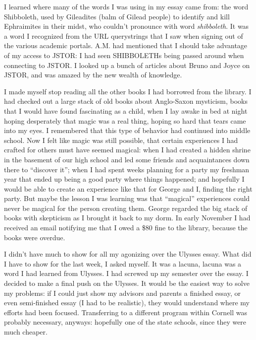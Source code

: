 I learned where many of the words I was using in my essay came from: the word
Shibboleth, used by Gileadites (balm of Gilead people) to identify and kill
Ephraimites in their midst, who couldn't pronounce with word \textit{shibboleth}.
It was a word I recognized from the URL querystrings that I saw when signing out
of the various academic portals.  A.M. had mentioned that I should take
advantage of my access to JSTOR: I had seen SHIBBOLETHs being passed around when
connecting to JSTOR.  I looked up a bunch of articles about Bruno and Joyce on
JSTOR, and was amazed by the new wealth of knowledge.

I made myself stop reading all the other books I had borrowed from the library.
I had checked out a large stack of old books about Anglo-Saxon mysticism, books
that I would have found fascinating as a child, when I lay awake in bed at night
hoping desperately that magic was a real thing, hoping so hard that tears came
into my eyes.  I remembered that this type of behavior had continued into middle
school.  Now I felt like magic was still possible, that certain experiences I
had crafted for others must have seemed magical: when I had created a hidden
shrine in the basement of our high school and led some friends and acquaintances
down there to ``discover it''; when I had spent weeks planning for a party my
freshman year that ended up being a good party where things happened; and
hopefully I would be able to create an experience like that for George and I,
finding the right party.  But maybe the lesson I was learning was that
``magical'' experiences could never be magical for the person creating them.
George regarded the big stack of books with skepticism as I brought it back to
my dorm.  In early November I had received an email notifying me that I owed a
\$80 fine to the library, because the books were overdue.

I didn't have much to show for all my agonizing over the Ulysses essay.  What
did I have to show for the last week, I asked myself.  It was a lacuna, lacuna
was a word I had learned from Ulysses. I had screwed up my semester over the
essay.  I decided to make a final push on the Ulysses.  It would be the easiest
way to solve my problems: if I could just show my advisors and parents a
finished essay, or even semi-finished essay (I had to be realistic), they would
understand where my efforts had been focused.  Transferring to a different
program within Cornell was probably necessary, anyways: hopefully one of the
state schools, since they were much cheaper.

